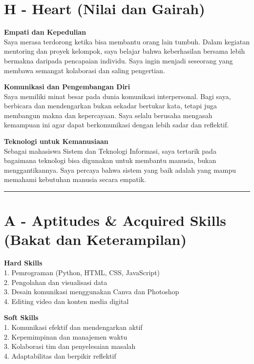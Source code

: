 \documentclass[
  letterpaper,
  DIV=11,
  numbers=noendperiod]{scrreprt}
\begin{document}
\section{H - Heart (Nilai dan Gairah)}\label{h---heart-nilai-dan-gairah}

\textbf{Empati dan Kepedulian}\\
Saya merasa terdorong ketika bisa membantu orang lain tumbuh. Dalam
kegiatan mentoring dan proyek kelompok, saya belajar bahwa keberhasilan
bersama lebih bermakna daripada pencapaian individu. Saya ingin menjadi
seseorang yang membawa semangat kolaborasi dan saling pengertian.

\textbf{Komunikasi dan Pengembangan Diri}\\
Saya memiliki minat besar pada dunia komunikasi interpersonal. Bagi
saya, berbicara dan mendengarkan bukan sekadar bertukar kata, tetapi
juga membangun makna dan kepercayaan. Saya selalu berusaha mengasah
kemampuan ini agar dapat berkomunikasi dengan lebih sadar dan reflektif.

\textbf{Teknologi untuk Kemanusiaan}\\
Sebagai mahasiswa Sistem dan Teknologi Informasi, saya tertarik pada
bagaimana teknologi bisa digunakan untuk membantu manusia, bukan
menggantikannya. Saya percaya bahwa sistem yang baik adalah yang mampu
memahami kebutuhan manusia secara empatik.

\begin{center}\rule{0.5\linewidth}{0.5pt}\end{center}

\section{A - Aptitudes \& Acquired Skills (Bakat dan
Keterampilan)}\label{a---aptitudes-acquired-skills-bakat-dan-keterampilan}

\textbf{Hard Skills}\\
1. Pemrograman (Python, HTML, CSS, JavaScript)\\
2. Pengolahan dan visualisasi data\\
3. Desain komunikasi menggunakan Canva dan Photoshop\\
4. Editing video dan konten media digital

\textbf{Soft Skills}\\
1. Komunikasi efektif dan mendengarkan aktif\\
2. Kepemimpinan dan manajemen waktu\\
3. Kolaborasi tim dan penyelesaian masalah\\
4. Adaptabilitas dan berpikir reflektif
\end{document}
